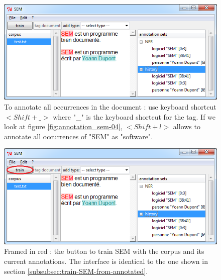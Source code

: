 \documentclass[manual-fr.tex]{subfiles}
\begin{document}
\begin{figure}[ht!]
    \begin{center}
    \includegraphics[scale=0.5]{fr/images/annotation_sem-05.png}
    \end{center}
    \caption{To annotate all occurrences in the document : use keyboard shortcut $<Shift+\_>$ where "\_" is the keyboard shortcut for the tag. If we look at figure \ref{fig:annotation_sem-04}, $<Shift+l>$ allows to annotate all occurrences of "SEM" as "software".}
    \label{fig:annotation_sem-05}
\end{figure}



\begin{figure}[ht!]
    \begin{center}
    \includegraphics[scale=0.5]{fr/images/annotation_sem-06.png}
    \end{center}
    \caption{Framed in red : the button to train SEM with the corpus and its current annotations. The interface is identical to the one shown in section \ref{subsubsec:train-SEM-from-annotated}.}
    \label{fig:annotation_sem-06}
\end{figure}
\end{document}
